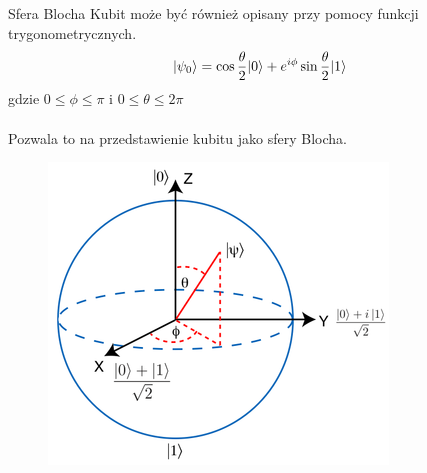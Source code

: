 \documentclass{beamer}
\DeclarePairedDelimiter\ket{\lvert}{\rangle}
\begin{document}
	
	\begin{frame}{}
		\begin{block}{Sfera Blocha}
			\vspace{0.5em}
			Kubit może być również opisany przy pomocy funkcji trygonometrycznych.
			\begin{equation*}
			\ket{\psi_{0}} = \cos{\frac{\theta}{2}}\ket{0} + e^{i\phi}\sin{\frac{\theta}{2}}\ket{1} 
			\end{equation*}
			gdzie $0\leq\phi\leq\pi$ i $0\leq\theta\leq2\pi$\\~\\
			Pozwala to na przedstawienie kubitu jako sfery Blocha.
			\vspace{0.5em}
		\end{block}
		\begin{figure}[hbt!]
			\centering
			\includegraphics[scale=0.8]{media/bloch.png}
		\end{figure}		
	\end{frame}
\end{document}
